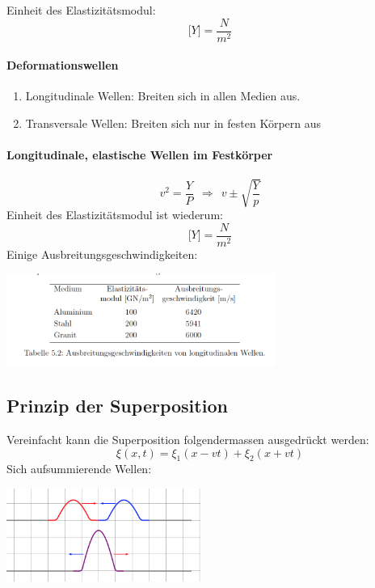 \documentclass[7pt]{article}
\begin{document}
\begin{multicols*}{3}
Einheit des Elastizit{\"a}tsmodul:
\begin{equation*}
\lbrack Y \rbrack = \frac{N}{m^2}
\end{equation*}

\paragraph{Deformationswellen}
\begin{enumerate}
  \item Longitudinale Wellen: Breiten sich in allen Medien aus.
  \item Transversale Wellen: Breiten sich nur in festen K{\"o}rpern aus
\end{enumerate}

\paragraph{Longitudinale, elastische Wellen im Festk{\"orper}}
\begin{equation*}
v^2 = \frac{Y}{P} \>\> \Longrightarrow \>\> v \pm \sqrt{\frac{Y}{p}}
\end{equation*}
Einheit des Elastizit{\"a}tsmodul ist wiederum:
\begin{equation*}
\lbrack Y \rbrack = \frac{N}{m^2}
\end{equation*}
\newline
Einige Ausbreitungsgeschwindigkeiten:
\begin{center}
	\includegraphics[width=250pt]{images/wellenausbreitungsgeschwindigkeit_long}
\end{center}

\subsection{Prinzip der Superposition}
Vereinfacht kann die Superposition folgendermassen ausgedr{\"u}ckt werden:
\begin{equation*}
\xi(x,t) = \xi _1(x-vt) + \xi _2(x+vt)
\end{equation*}
\newline
Sich aufsummierende Wellen:
\begin{center}
	\includegraphics[width=180pt]{images/superposition2.png}
\end{center}
\columnbreak


\end{multicols*}
\end{document}
